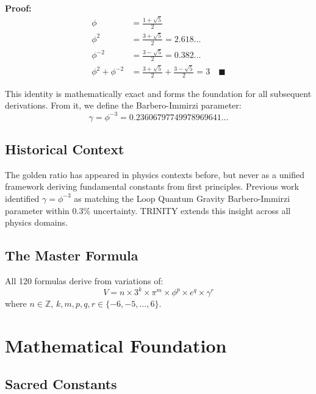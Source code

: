 \documentclass[12pt,a4paper]{article}
\begin{document}
\textbf{Proof:}
\begin{align}
\phi &= \frac{1+\sqrt{5}}{2} \\
\phi^2 &= \frac{3+\sqrt{5}}{2} = 2.618\dots \\
\phi^{-2} &= \frac{3-\sqrt{5}}{2} = 0.382\dots \\
\phi^2 + \phi^{-2} &= \frac{3+\sqrt{5}}{2} + \frac{3-\sqrt{5}}{2} = 3 \quad \blacksquare
\end{align}

This identity is mathematically exact and forms the foundation for all
subsequent derivations. From it, we define the Barbero-Immirzi parameter:
\begin{equation}
\gamma = \phi^{-3} = 0.23606797749978969641\dots
\end{equation}

\subsection{Historical Context}

The golden ratio has appeared in physics contexts before, but never as a
unified framework deriving fundamental constants from first principles.
Previous work identified $\gamma = \phi^{-3}$ as matching the Loop Quantum
Gravity Barbero-Immirzi parameter within 0.3\% uncertainty. TRINITY extends
this insight across all physics domains.

\subsection{The Master Formula}

All 120 formulas derive from variations of:
\begin{equation}
V = n \times 3^k \times \pi^m \times \phi^p \times e^q \times \gamma^r
\end{equation}
where $n \in \mathbb{Z}$, $k,m,p,q,r \in \{-6,-5,\dots,6\}$.

\section{Mathematical Foundation}

\subsection{Sacred Constants}
\end{document}
